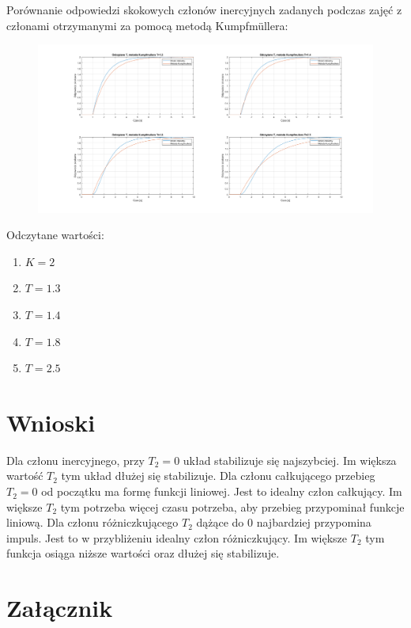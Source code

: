 \documentclass{article}
\begin{document}
\newpage
Porównanie odpowiedzi skokowych członów inercyjnych zadanych podczas zajęć z członami otrzymanymi za pomocą metodą Kumpfmüllera:
\begin{figure}[h!]
\hspace{-5cm}
    \includegraphics[scale=0.5]{kumpf_inerc_a_b_c_d.png}
    \label{fig:each_iner}
\end{figure}{}


Odczytane wartości:
\begin{enumerate}[label=\alph*)]
\item[] $K=2$
\item $T=1.3$
\item $T=1.4$
\item $T=1.8$  
\item $T=2.5$
\end{enumerate}{}



\section{Wnioski}

Dla członu inercyjnego, przy $T_{2}=0$ układ stabilizuje się najszybciej. Im większa wartość $T_{2}$ tym układ dłużej się stabilizuje. Dla członu całkującego przebieg $T_{2}=0$ od początku ma formę funkcji liniowej. Jest to idealny człon całkujący. Im większe $T_{2}$ tym potrzeba więcej czasu potrzeba, aby przebieg przypominał funkcje liniową. Dla członu różniczkującego $T_{2}$ dążące do 0 najbardziej przypomina impuls. Jest to w przybliżeniu idealny człon różniczkujący. Im większe $T_{2}$ tym funkcja osiąga niższe wartości oraz dłużej się stabilizuje.

\newpage


\section{Załącznik}
\end{document}
